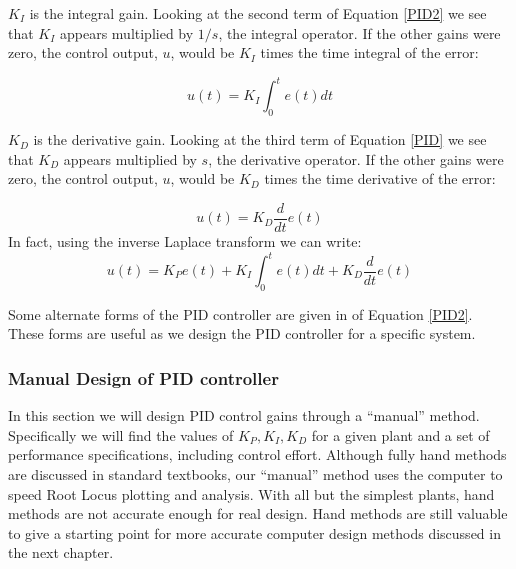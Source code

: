 {\bf $K_I$} is the integral gain.
Looking at the second term of Equation \ref{PID2} we see that $K_I$ appears multiplied by $1/s$, the integral operator.  If the other gains were zero, the control output, $u$, would be $K_I$ times the time integral of the error:	%

\[
u(t) = K_I \int_0^t e(t) dt
\]






{\bf $K_D$} is the derivative gain.
Looking at the third term of Equation \ref{PID} we see that $K_D$ appears multiplied by $s$, the derivative operator.  If the other gains were zero, the control output, $u$, would be $K_D$ times the time derivative of the error:	%

\[
u(t) = K_D \frac{d}{dt}e(t)
\]
In fact, using the inverse Laplace transform we can write:
\[
u(t) = K_P e(t)  + K_I \int_0^t e(t) dt + K_D \frac{d}{dt}e(t)
\]


Some alternate forms of the PID controller are given in of Equation \ref{PID2}.  These forms are useful as we design the PID controller for a specific system.



\subsubsection{Manual Design of PID controller}\label{manualPIDdesign}

In this section we will design PID control gains through a ``manual'' method.  Specifically we will find the values of $K_P, K_I, K_D$ for a given plant and a set of performance specifications, including control effort.  Although fully hand methods are discussed in standard textbooks, our ``manual'' method uses the computer to speed Root Locus plotting and analysis.   With all but the simplest plants, hand methods are not accurate enough for real design.  Hand methods are still valuable to give a starting point for more accurate computer design methods discussed in the next chapter.

